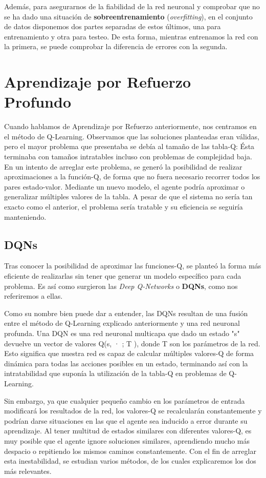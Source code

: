 Además, para asegurarnos de la fiabilidad de la red neuronal y comprobar que no se ha dado una situación de \textbf{sobreentrenamiento} (\textit{overfitting}), en el conjunto de datos disponemos dos partes separadas de estos últimos, una para entrenamiento y otra para testeo. De esta forma, mientras entrenamos la red con la primera, se puede comprobar la diferencia de errores con la segunda. 

\section{Aprendizaje por Refuerzo Profundo}

Cuando hablamos de Aprendizaje por Refuerzo anteriormente, nos centramos en el método de Q-Learning. Observamos que las soluciones planteadas eran válidas, pero el mayor problema que presentaba se debía al tamaño de las tabla-Q: Ésta terminaba con tamaños intratables incluso con problemas de complejidad baja. En un intento de arreglar este problema, se generó la posibilidad de realizar aproximaciones a la función-Q, de forma que no fuera necesario recorrer todos los pares estado-valor. Mediante un nuevo modelo, el agente podría aproximar o generalizar múltiples valores de la tabla. A pesar de que el sistema no sería tan exacto como el anterior, el problema sería tratable y su eficiencia se seguiría manteniendo.

\subsection{DQNs}

Tras conocer la posibilidad de aproximar las funciones-Q, se planteó la forma más eficiente de realizarlas sin tener que generar un modelo específico para cada problema. Es así como surgieron las \textit{Deep Q-Networks} o \textbf{DQNs}, como nos referiremos a ellas. 

Como su nombre bien puede dar a entender, las DQNs resultan de una fusión entre el método de Q-Learning explicado anteriormente y una red neuronal profunda. Una DQN es una red neuronal multicapa que dado un estado "s" devuelve un vector de valores Q(s, · ; T ), donde T son los parámetros de la red. Esto significa que nuestra red es capaz de calcular múltiples valores-Q de forma dinámica para todas las acciones posibles en un estado, terminando así con la intratabilidad que suponía la utilización de la tabla-Q en problemas de Q-Learning.

Sin embargo, ya que cualquier pequeño cambio en los parámetros de entrada modificará los resultados de la red, los valores-Q se recalcularán constantemente y podrían darse situaciones en las que el agente sea inducido a error durante su aprendizaje. Al tener multitud de estados similares con diferentes valores-Q, es muy posible que el agente ignore soluciones similares, aprendiendo mucho más despacio o repitiendo los mismos caminos constantemente. Con el fin de arreglar esta inestabilidad, se estudian varios métodos, de los cuales explicaremos los dos más relevantes.

